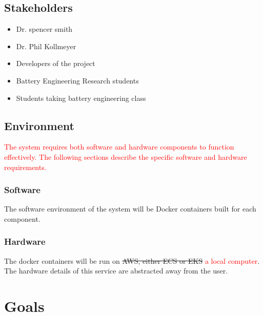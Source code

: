 \documentclass{article}
\begin{document}
\subsection{Stakeholders}

\begin{itemize}
    \item Dr. spencer smith
    \item Dr. Phil Kollmeyer
    \item Developers of the project
    \item Battery Engineering Research students
    \item Students taking battery engineering class
\end{itemize}

\subsection{Environment}
\textcolor{red}{The system requires both software and hardware components to function effectively. The following sections describe the specific software and hardware requirements.  }

\subsubsection{Software}
The software environment of the system will be Docker containers built for each component.

\subsubsection{Hardware}
The docker containers will be run on \sout{AWS, either ECS or EKS} \textcolor{red}{a local computer}. The hardware details of this service are abstracted away from the user.

\section{Goals}
\end{document}
